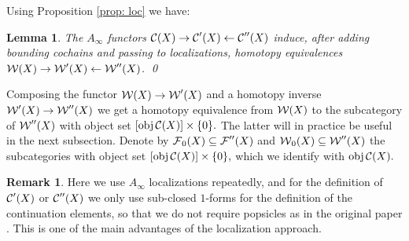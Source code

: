 \documentclass{article}
\theoremstyle{plain}%
\newtheorem{lem}[thm]{Lemma}
\theoremstyle{definition}
\newtheorem{rem}[thm]{Remark}
\newtheorem{hp}[thm]{Hypothesis}
\numberwithin{equation}{section}
\numberwithin{figure}{section}
\def\eq{\eqref}
\def\l{\label}
\def\cC{{\mathbin{\cal C}}}
\def\cF{{\mathbin{\cal F}}}
\def\cW{{\mathbin{\cal W}}}
\def\la{\lambda}
\def\-{\setminus}
\def\iy{\infty}
\def\sb{\subseteq}
\begin{document}
Using Proposition \ref{prop: loc} we have:
\begin{lem}
The $A_\iy$ functors $\cC(X)\to \cC'(X) \leftarrow  \cC''(X) $ induce, after adding bounding cochains and passing to localizations, homotopy equivalences $\cW(X)\to \cW'(X) \leftarrow  \cW''(X)$. \qed 
\end{lem}




Composing the functor $\cW(X)\to \cW'(X)$ and a homotopy inverse $\cW'(X)\to \cW''(X)$ we get a homotopy equivalence from $\cW(X)$ to the subcategory of $\cW''(X)$ with object set $[\obj\cC(X)]\times\{0\}.$ The latter will in practice be useful in the next subsection. Denote by $\cF_0(X)\sb\cF''(X)$ and $\cW_0(X)\sb\cW''(X)$ the subcategories with object set  $[\obj\cC(X)]\times\{0\},$ which we  identify with $\obj\cC(X).$


\begin{rem}
Here we use $A_\iy$ localizations repeatedly, and for the definition of $\cC'(X)$ or $\cC''(X)$ we only use sub-closed $1$-forms for the definition of the continuation elements, so that we do not require popsicles as in the original paper \cite{AS}.  This is one of the main advantages of the localization approach.%
\end{rem}




\end{document}
